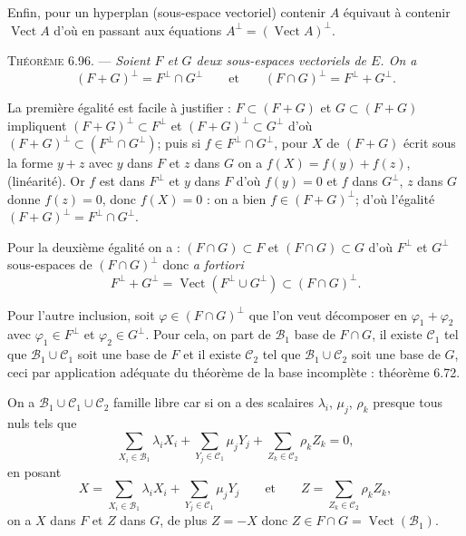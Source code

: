 Enfin, pour un hyperplan (sous-espace vectoriel) contenir $A$ équivaut à contenir $\operatorname{Vect}A$ d'où en passant aux équations $A^\perp=(\operatorname{Vect}A)^\perp$. \bookend

\medskip\noindent\textsc{Théorème 6.96.} --- \emph{Soient $F$ et $G$ deux sous-espaces vectoriels de $E$. On a
\[
(F+G)^\perp=F^\perp\cap G^\perp
\qquad\text{et}\qquad
(F\cap G)^\perp=F^\perp+G^\perp.
\]}

La première égalité est facile à justifier : $F\subset(F+G)$ et $G\subset(F+G)$ impliquent $(F+G)^\perp\subset F^\perp$ et $(F+G)^\perp\subset G^\perp$ d'où $(F+G)^\perp\subset(F^\perp\cap G^\perp)$; puis si $f\in F^\perp\cap G^\perp$, pour $X$ de $(F+G)$ écrit sous la forme $y+z$ avec $y$ dans $F$ et $z$ dans $G$ on a $f(X)=f(y)+f(z)$, (linéarité). Or $f$ est dans $F^\perp$ et $y$ dans $F$ d'où $f(y)=0$ et $f$ dans $G^\perp$, $z$ dans $G$ donne $f(z)=0$, donc $f(X)=0$ : on a bien $f\in(F+G)^\perp$; d'où l'égalité $(F+G)^\perp=F^\perp\cap G^\perp$.

Pour la deuxième égalité on a : $(F\cap G)\subset F$ et $(F\cap G)\subset G$ d'où $F^\perp$ et $G^\perp$ sous-espaces de $(F\cap G)^\perp$ donc \emph{a fortiori}
\[
F^\perp+G^\perp=\operatorname{Vect}(F^\perp\cup G^\perp)\subset(F\cap G)^\perp.
\]

Pour l'autre inclusion, soit $\varphi\in(F\cap G)^\perp$ que l'on veut décomposer en $\varphi_1+\varphi_2$ avec $\varphi_1\in F^\perp$ et $\varphi_2\in G^\perp$. Pour cela, on part de $\mathcal B_1$ base de $F\cap G$, il existe $\mathcal C_1$ tel que $\mathcal B_1\cup\mathcal C_1$ soit une base de $F$ et il existe $\mathcal C_2$ tel que $\mathcal B_1\cup\mathcal C_2$ soit une base de $G$, ceci par application adéquate du théorème de la base incomplète : théorème 6.72.

On a $\mathcal B_1\cup\mathcal C_1\cup\mathcal C_2$ famille libre car si on a des scalaires $\lambda_i$, $\mu_j$, $\rho_k$ presque tous nuls tels que
\[
\sum_{X_i\in\mathcal B_1}\lambda_iX_i+\sum_{Y_j\in\mathcal C_1}\mu_jY_j+\sum_{Z_k\in\mathcal C_2}\rho_kZ_k=0,
\]
en posant
\[
X=\sum_{X_i\in\mathcal B_1}\lambda_iX_i+\sum_{Y_j\in\mathcal C_1}\mu_jY_j
\qquad\text{et}\qquad
Z=\sum_{Z_k\in\mathcal C_2}\rho_kZ_k,
\]
on a $X$ dans $F$ et $Z$ dans $G$, de plus $Z=-X$ donc $Z\in F\cap G=\operatorname{Vect}(\mathcal B_1)$.

